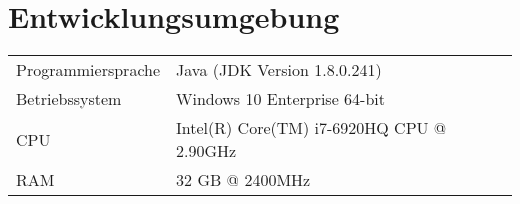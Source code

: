 \chapter{Entwicklungsumgebung}\label{ch:entwicklungsumgebung}


\begin{table}[!htb]
    \centering
    \begin{tabularx}{\textwidth}{X | X }
        Programmiersprache               & Java (JDK Version 1.8.0.241)             \\
        Betriebssystem                   & Windows 10 Enterprise 64-bit             \\
        CPU                              & Intel(R) Core(TM) i7-6920HQ CPU @ 2.90GHz \\
        RAM                              & 32 GB @ 2400MHz

    \end{tabularx}
\end{table}
